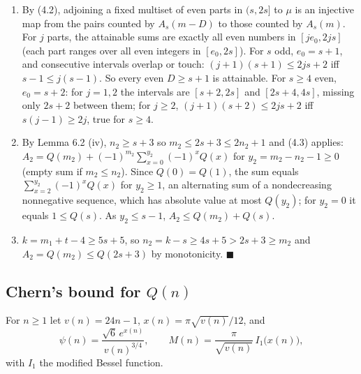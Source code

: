 \begin{enumerate}
\def\labelenumi{(\arabic{enumi})}
\setcounter{enumi}{1}
\item
  By (4.2), adjoining a fixed multiset of even parts in \((s,2s]\) to \(\mu\) is an injective map from the pairs counted by \(A_s(m-D)\) to those counted by \(A_s(m)\). For \(j\) parts, the attainable sums are exactly all even numbers in \([je_0,2js]\) (each part ranges over all even integers in \([e_0,2s]\)). For \(s\) odd, \(e_0=s+1\), and consecutive intervals overlap or touch: \((j+1)(s+1)\le2js+2\) iff \(s-1\le j(s-1)\). So every even \(D\ge s+1\) is attainable. For \(s\ge4\) even, \(e_0=s+2\): for \(j=1,2\) the intervals are \([s+2,2s]\) and \([2s+4,4s]\), missing only \(2s+2\) between them; for \(j\ge2\), \((j+1)(s+2)\le 2js+2\) iff \(s(j-1)\ge2j\), true for \(s\ge4\).
\item
  By Lemma 6.2 (iv), \(n_2\ge s+3\) so \(m_2\le2s+3\le2n_2+1\) and (4.3) applies: \(A_2=Q(m_2)+(-1)^{m_2}\sum_{x=0}^{y_2}(-1)^xQ(x)\) for \(y_2=m_2-n_2-1\ge0\) (empty sum if \(m_2\le n_2\)). Since \(Q(0)=Q(1)\), the sum equals \(\sum_{x=2}^{y_2}(-1)^xQ(x)\) for \(y_2\ge1\), an alternating sum of a nondecreasing nonnegative sequence, which has absolute value at most \(Q(y_2)\); for \(y_2=0\) it equals \(1\le Q(s)\). As \(y_2\le s-1\), \(A_2\le Q(m_2)+Q(s)\).
\item
  \(k=m_1+t-4\ge5s+5\), so \(n_2=k-s\ge4s+5>2s+3\ge m_2\) and \(A_2=Q(m_2)\le Q(2s+3)\) by monotonicity. \(\blacksquare\)
\end{enumerate}

\subsection{\texorpdfstring{Chern's bound for \(Q(n)\)}{Chern's bound for Q(n)}}\label{cherns-bound-for-qn}

For \(n\ge1\) let \(v(n)=24n-1\), \(x(n)=\pi\sqrt{v(n)}/12\), and
\[\psi(n)=\frac{\sqrt6\,e^{x(n)}}{v(n)^{3/4}},\qquad M(n)=\frac{\pi}{\sqrt{v(n)}}\,I_1\bigl(x(n)\bigr),\]
with \(I_1\) the modified Bessel function.

